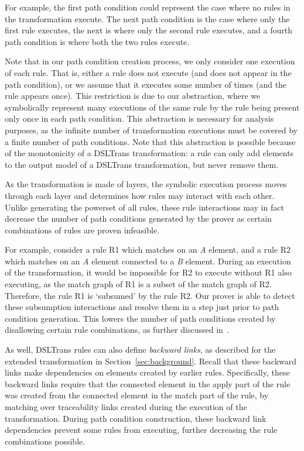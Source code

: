 For example, the first path condition could represent the case where no rules in the transformation execute.
The next path condition is the case where only the first rule executes, the next
is where only the second rule executes, and a fourth path condition is where
both the two rules execute.

Note that in our path condition creation process, we
only consider one execution of each rule. That is, either a rule does not
execute (and does not appear in the path condition), or we assume that it executes some number of times (and the rule appears once). This restriction is due to our abstraction, where we symbolically represent
many executions of the same rule by the rule being present only once in each path
condition. This abstraction is necessary for analysis purposes, as the infinite number of transformation executions must be covered by a finite number of path conditions. Note that this abstraction is possible because of the
monotonicity of a DSLTrans transformation: a rule can only add elements to the
output model of a DSLTrans transformation, but never remove them.

As the transformation is made of layers, the symbolic execution process moves
through each layer and determines how rules may interact with each other. Unlike generating the powerset of all rules, these
rule interactions may in fact decrease the number of path conditions generated
by the prover as certain combinations of rules are proven infeasible. 

For example, consider a rule R1 which matches on an \textit{A} element, and a
rule R2 which matches on an \textit{A} element connected to a \textit{B}
element. During an execution of the transformation, it would be impossible for R2 to execute without R1 also executing, as the match graph of R1 is a subset of the match graph of R2. Therefore, the rule R1 is `subsumed' by the rule R2. Our prover is able to detect these subsumption interactions and resolve them in a step just prior to path condition generation. This lowers the number of path conditions created by disallowing certain rule combinations, as further discussed in~\cite{Selim2014}.

As well, DSLTrans rules can also define \textit{backward links}, as described for the extended \FTP transformation in Section~\ref{sec:background}. Recall that these backward links make dependencies on elements created by earlier rules. Specifically, these backward links require that the connected element in the apply part of the rule was created from the connected element in the match part of the rule, by matching over traceability links created during the execution of the transformation. During path condition construction, these backward link dependencies prevent some rules from executing, further decreasing the rule combinations possible.

